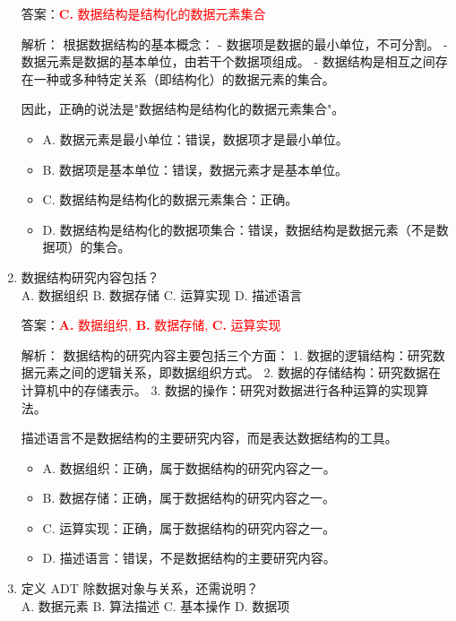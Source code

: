 \documentclass[lang=cn,newtx,10pt,scheme=chinese]{../../../elegantbook}
\begin{document}
\begin{enumerate}
    答案：\textcolor{red}{\textbf{C.} 数据结构是结构化的数据元素集合}

    解析：
    根据数据结构的基本概念：
    - 数据项是数据的最小单位，不可分割。
    - 数据元素是数据的基本单位，由若干个数据项组成。
    - 数据结构是相互之间存在一种或多种特定关系（即结构化）的数据元素的集合。
    
    因此，正确的说法是"数据结构是结构化的数据元素集合"。

    \begin{itemize}
        \item A. 数据元素是最小单位：错误，数据项才是最小单位。
        \item B. 数据项是基本单位：错误，数据元素才是基本单位。
        \item C. 数据结构是结构化的数据元素集合：正确。
        \item D. 数据结构是结构化的数据项集合：错误，数据结构是数据元素（不是数据项）的集合。
    \end{itemize}

    \item 数据结构研究内容包括？\\
    A. 数据组织 \quad B. 数据存储 \quad C. 运算实现 \quad D. 描述语言

    答案：\textcolor{red}{\textbf{A.} 数据组织, \textbf{B.} 数据存储, \textbf{C.} 运算实现}

    解析：
    数据结构的研究内容主要包括三个方面：
    1. 数据的逻辑结构：研究数据元素之间的逻辑关系，即数据组织方式。
    2. 数据的存储结构：研究数据在计算机中的存储表示。
    3. 数据的操作：研究对数据进行各种运算的实现算法。
    
    描述语言不是数据结构的主要研究内容，而是表达数据结构的工具。

    \begin{itemize}
        \item A. 数据组织：正确，属于数据结构的研究内容之一。
        \item B. 数据存储：正确，属于数据结构的研究内容之一。
        \item C. 运算实现：正确，属于数据结构的研究内容之一。
        \item D. 描述语言：错误，不是数据结构的主要研究内容。
    \end{itemize}

    \item 定义 ADT 除数据对象与关系，还需说明？\\
    A. 数据元素 \quad B. 算法描述 \quad C. 基本操作 \quad D. 数据项


\end{enumerate}
\end{document}
